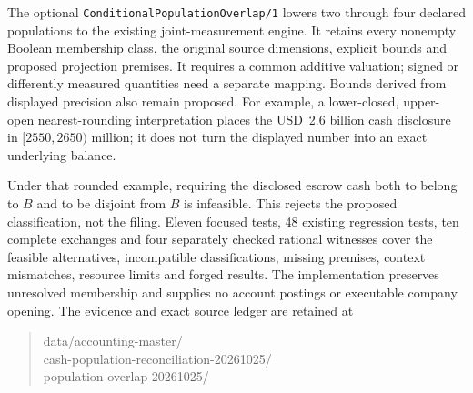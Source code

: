 The optional \texttt{ConditionalPopulationOverlap/1} lowers two through four
declared populations to the existing joint-measurement engine. It retains
every nonempty Boolean membership class, the original source dimensions,
explicit bounds and proposed projection premises. It requires a common
additive valuation; signed or differently measured quantities need a separate
mapping. Bounds derived from displayed precision also remain proposed. For
example, a lower-closed, upper-open nearest-rounding interpretation places
the USD~2.6 billion cash disclosure in $[2550,2650)$ million; it does not turn
the displayed number into an exact underlying balance.

Under that rounded example, requiring the disclosed escrow cash both to belong
to $B$ and to be disjoint from $B$ is infeasible. This rejects the proposed
classification, not the filing. Eleven focused tests, 48 existing regression
tests, ten complete exchanges and four separately checked rational witnesses
cover the feasible alternatives, incompatible classifications, missing premises,
context mismatches, resource limits and forged results. The implementation
preserves unresolved membership and supplies no account postings or executable
company opening. The evidence and exact source ledger are retained at
\begin{quote}\small\ttfamily
data/accounting-master/\\
cash-population-reconciliation-20261025/\\
population-overlap-20261025/
\end{quote}
